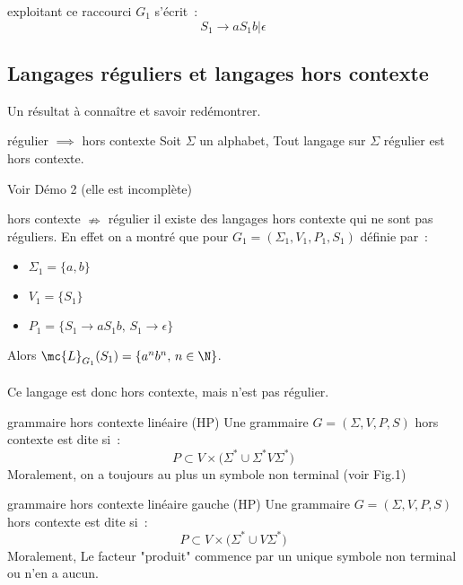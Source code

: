\begin{adjustwidth}{-3cm}{-3cm}
\begin{exemple}{}{exploitant ce raccourci}
    $G_1$ s'écrit~:
    $$S_1 \rightarrow aS_1b \vert \epsilon$$
\end{exemple}

\subsection{Langages réguliers et langages hors contexte}

Un résultat à connaître et savoir redémontrer.
\begin{proposition}{}{régulier $\implies$ hors contexte}
    Soit $\Sigma$ un alphabet, Tout langage sur $\Sigma$ régulier est hors contexte.
\end{proposition}
Voir Démo 2 (elle est incomplète)

\begin{remarque}{}{hors contexte $\nRightarrow$ régulier}
    il existe des langages hors contexte qui ne sont pas réguliers. En effet on a montré que pour $G_1 = (\Sigma_1, V_1, P_1, S_1)$ définie par~:
    \begin{itemize}
        \item $\Sigma_1 = \{a,b\}$
        \item $V_1 = \{S_1\}$
        \item $P_1 = \{S_1 \rightarrow a S_1 b,\,S_1\rightarrow \epsilon\}$
    \end{itemize}
    Alors $\mc{L}_{G_1}(S_1) = \{a^nb^n,\, n \in \N\}$.\\\\
    Ce langage est donc hors contexte, mais n'est pas régulier.
\end{remarque}

\begin{definition}{}{grammaire hors contexte linéaire (HP)}
    Une grammaire $G = (\Sigma, V, P, S)$ hors contexte est dite  si~:
        $$P \subset V \times \big(\Sigma^* \cup \Sigma^*V\Sigma^*\big)$$
    Moralement, on a toujours au plus un symbole non terminal (voir Fig.1)
\end{definition}

\begin{definition}{}{grammaire hors contexte linéaire gauche (HP)}
    Une grammaire $G = (\Sigma, V, P, S)$ hors contexte est dite  si~:
        $$P \subset V \times \big( \Sigma^* \cup V \Sigma^* \big)$$
    Moralement, Le facteur "produit" commence par un unique symbole non terminal ou n'en a aucun.
\end{definition}


\end{adjustwidth}
